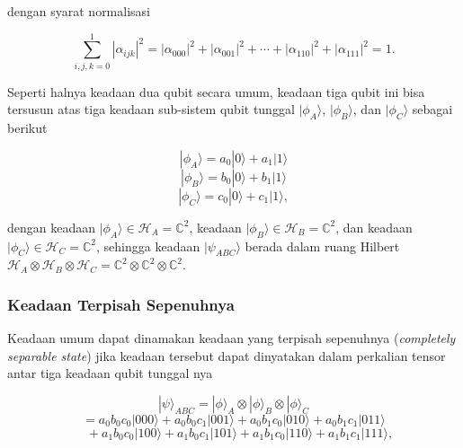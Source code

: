 dengan syarat normalisasi

\begin{equation}
\sum_{i,j,k=0}^{1}
|\alpha_{ijk}|^2
=
|\alpha_{000}|^2
+ |\alpha_{001}|^2
+ \cdots
+ |\alpha_{110}|^2
+ |\alpha_{111}|^2
= 1.
\end{equation}

Seperti halnya keadaan dua qubit secara umum, keadaan tiga qubit ini bisa tersusun atas
tiga keadaan sub-sistem qubit tunggal $|\phi_A\rangle$, $|\phi_B\rangle$, dan $|\phi_C\rangle$
sebagai berikut

\begin{equation}
|\phi_A\rangle = a_0 |0\rangle + a_1 |1\rangle
\end{equation}
\begin{equation}
|\phi_B\rangle = b_0 |0\rangle + b_1 |1\rangle
\end{equation}
\begin{equation}
|\phi_C\rangle = c_0 |0\rangle + c_1 |1\rangle ,
\end{equation}

dengan keadaan $|\phi_A\rangle \in \mathcal{H}_A = \mathbb{C}^2$, keadaan
$|\phi_B\rangle \in \mathcal{H}_B = \mathbb{C}^2$, dan keadaan
$|\phi_C\rangle \in \mathcal{H}_C = \mathbb{C}^2$, sehingga keadaan
$|\psi_{ABC}\rangle$ berada dalam ruang Hilbert
$\mathcal{H}_A \otimes \mathcal{H}_B \otimes \mathcal{H}_C
= \mathbb{C}^2 \otimes \mathbb{C}^2 \otimes \mathbb{C}^2$.

\subsubsection{Keadaan Terpisah Sepenuhnya}

Keadaan umum dapat dinamakan keadaan yang terpisah sepenuhnya
(\textit{completely separable state}) jika keadaan tersebut dapat dinyatakan dalam
perkalian tensor antar tiga keadaan qubit tunggal nya

\begin{equation}
|\psi\rangle_{ABC}
=
|\phi\rangle_A \otimes |\phi\rangle_B \otimes |\phi\rangle_C
\end{equation}
\begin{equation}
=
a_0 b_0 c_0 |000\rangle
+ a_0 b_0 c_1 |001\rangle
+ a_0 b_1 c_0 |010\rangle
+ a_0 b_1 c_1 |011\rangle
\end{equation}
\begin{equation}
\quad
+ a_1 b_0 c_0 |100\rangle
+ a_1 b_0 c_1 |101\rangle
+ a_1 b_1 c_0 |110\rangle
+ a_1 b_1 c_1 |111\rangle ,
\end{equation}

